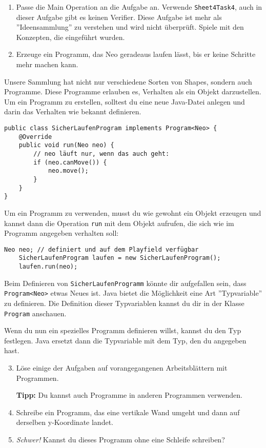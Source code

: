 
\begin{enumerate}
	\item Passe die Main Operation an die Aufgabe an.
		Verwende \lstinline{Sheet4Task4}, auch in dieser Aufgabe gibt es keinen Verifier.
		Diese Aufgabe ist mehr als ''Ideensammlung'' zu verstehen und wird nicht überprüft.
		Spiele mit den Konzepten, die eingeführt wurden.
	\item Erzeuge ein Programm, das Neo geradeaus laufen lässt, bis er keine Schritte mehr machen kann.
\end{enumerate}

\begin{Infobox}[Programme]
	Unsere Sammlung hat nicht nur verschiedene Sorten von Shapes, sondern auch Programme.
	Diese Programme erlauben es, Verhalten als ein Objekt darzustellen.
	Um ein Programm zu erstellen, solltest du eine neue Java-Datei anlegen und darin das Verhalten wie bekannt definieren.

	\begin{lstlisting}[title=SicherLaufenProgram.java, numbers=none,xleftmargin=0.5cm]
public class SicherLaufenProgram implements Program<Neo> {
	@Override
	public void run(Neo neo) {
		// neo läuft nur, wenn das auch geht:
		if (neo.canMove()) {
			neo.move();
		}
	}
}
	\end{lstlisting}

	Um ein Programm zu verwenden, musst du wie gewohnt ein Objekt erzeugen und kannst dann die Operation \lstinline{run} mit dem Objekt aufrufen, die sich wie im Programm angegeben verhalten soll:

	\begin{lstlisting}[numbers=none,xleftmargin=0.5cm]
	Neo neo; // definiert und auf dem Playfield verfügbar
	SicherLaufenProgram laufen = new SicherLaufenProgram();
	laufen.run(neo);
	\end{lstlisting}
\end{Infobox}

\begin{Infobox}
	Beim Definieren von \lstinline{SicherLaufenProgramm} könnte dir aufgefallen sein, dass \mbox{\lstinline{Program<Neo>}} etwas Neues ist.
	Java bietet die Möglichkeit eine Art ''Typvariable'' zu definieren.
	Die Definition dieser Typvariablen kannst du dir in der Klasse \lstinline{Program} anschauen.

	Wenn du nun ein spezielles Programm definieren willst, kannst du den Typ festlegen.
	Java ersetzt dann die Typvariable mit dem Typ, den du angegeben hast.
\end{Infobox}

\begin{enumerate}\setcounter{enumi}{2}
	\item Löse einige der Aufgaben auf vorangegangenen Arbeitsblättern mit Programmen.
	
	\textbf{Tipp:} Du kannst auch Programme in anderen Programmen verwenden.
	\item Schreibe ein Programm, das eine vertikale Wand umgeht und dann auf derselben y-Koordinate landet.
	\item \optional \emph{Schwer!} Kannst du dieses Programm ohne eine Schleife schreiben?
\end{enumerate}
